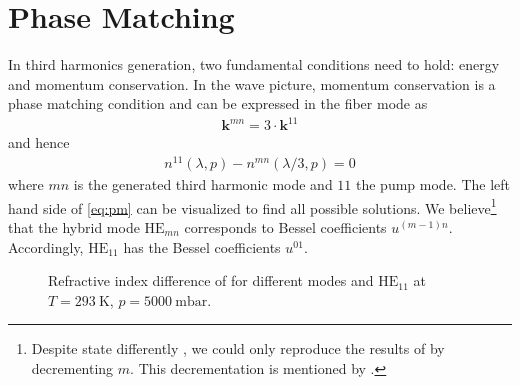 \documentclass[fleqn, 10pt, twocolumn]{SelfArx}
\begin{document}
    \section{Phase Matching}
    In third harmonics generation, two fundamental conditions need to hold: energy and momentum conservation. 
    In the wave picture, momentum conservation is a phase matching condition and can be expressed in the fiber mode as
    \begin{align}
        \mathbf{k}^{mn} = 3 \cdot \mathbf k^{11} 
    \end{align}
    and hence
    \begin{align}
        n^{11}(\lambda, p) - n^{mn}(\lambda / 3, p)= 0
        \label{eq:pm}
    \end{align}
    where $mn$ is the generated third harmonic mode and $11$ the pump mode. 
    The left hand side of \eqref{eq:pm} can be visualized to find all possible solutions. 
    We believe\footnote{Despite \citeauthor{Travers2011} state differently \cite{Travers2011}, we could only reproduce the results of \citeauthor{Nold2010} by decrementing $m$. This decrementation is mentioned by \citeauthor{Marcatili1964} \cite{Marcatili1964}.} that the hybrid mode $\text{HE}_{mn}$ corresponds to Bessel coefficients $u^{(m-1)n}$. 
    Accordingly, $\text{HE}_{11}$ has the Bessel coefficients $u^{01}$.
    \begin{figure}[h]
        \centering
        \caption{Refractive index difference of  for different  modes and $\text{HE}_{11}$ at $T=\SI{293}{\kelvin}$, $p=\SI{5000}{\milli\bar}$.}
        \label{plt:pm}
    \end{figure}
\end{document}
